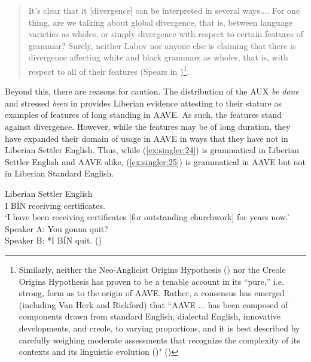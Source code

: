 \documentclass[output=paper,colorlinks,citecolor=brown]{langscibook}
\begin{document}
\begin{quote}
It's clear that it [divergence] can be interpreted in several ways...{.} For one thing, are we talking about global divergence, that is, between language varieties as wholes, or simply divergence with respect to certain features of grammar? Surely, neither Labov nor anyone else is claiming that there is divergence affecting white and black grammars as wholes, that is, with respect to all of their features (Spears in \citealt[50]{FasoldRickford1987})\footnote{Similarly, neither the Neo-Anglicist Origins Hypothesis (\citealt{VanHerk2015}) nor the Creole Origins Hypothesis \citep{rickford2015creoleorigins} has proven to be a tenable account in its “pure,” i.e. strong, form as to the origin of AAVE. Rather, a consensus has emerged (including Van Herk and Rickford) that “AAVE ... has been composed of components drawn from standard English, dialectal English, innovative developments, and creole, to varying proportions, and it is best described by carefully weighing moderate assessments that recognize the complexity of its contexts and its linguistic evolution (\citealt{Winford1997originssocio, Winford1998originsfeatures, winford2015origins})" (\citealt[136]{schneider2015documenting})}.\end{quote}

Beyond this, there are reasons for caution. The distribution of the AUX \textit{be done} and stressed \textit{been} in  provides Liberian evidence attesting to their stature as examples of features of long standing in AAVE. As such, the features stand against divergence. However, while the features may be of long duration, they have expanded their domain of usage in AAVE in ways that they have not in Liberian Settler English. Thus, while (\ref{ex:singler:24}) is grammatical in Liberian Settler English and AAVE alike, (\ref{ex:singler:25}) is grammatical in AAVE but not in Liberian Standard English.



\ea%
Liberian Settler English\\
    \label{ex:singler:24}
     I BÍN receiving certificates. \\
    ‘I have been receiving certificates [for outstanding churchwork] for years now.’
\ex
    \label{ex:singler:25}
    Speaker A: You gonna quit?  \\
    Speaker B: *I BÍN quit. (\citealt[136]{Labov1998})    \\
     
\z
\end{document}
